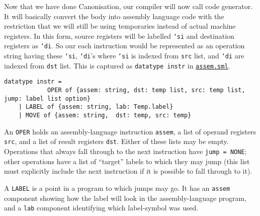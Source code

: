 Now that we have done Canonisation, our compiler will now call code
generator. It will basically convert the body into assembly language
code with the restriction that we will still be using temporaries
instead of actual machine registers. In this form, source registers will
be labelled
\texttt{`si} and
destination registers as
\texttt{`di}. So
our each instruction would be represented as an operation string having
these
\texttt{`si},
\texttt{`di}'s
where
\texttt{`si} is
indexed from
\texttt{src}
list, and
\texttt{`di} are
indexed from
\texttt{dst}
list. This is captured as
\texttt{datatype instr}
in
\href{https://www.github.com/sourabh2311/btp/tree/master/Compiler/assem.sml}{\texttt{assem.sml}}.

\begin{verbatim}
datatype instr = 
            OPER of {assem: string, dst: temp list, src: temp list, jump: label list option}
    | LABEL of {assem: string, lab: Temp.label}
    | MOVE of {assem: string,  dst: temp, src: temp}
\end{verbatim}

An \texttt{OPER}
holds an assembly-language instruction
\texttt{assem},
a list of operand registers
\texttt{src},
and a list of result registers
\texttt{dst}.
Either of these lists may be empty. Operations that always fall through
to the next instruction have
\texttt{jump = NONE};
other operations have a list of ``target'' labels to which they may jump
(this list must explicitly include the next instruction if it is
possible to fall through to it).

A \texttt{LABEL}
is a point in a program to which jumps may go. It has an
\texttt{assem}
component showing how the label will look in the assembly-language
program, and a
\texttt{lab}
component identifying which label-symbol was used.

